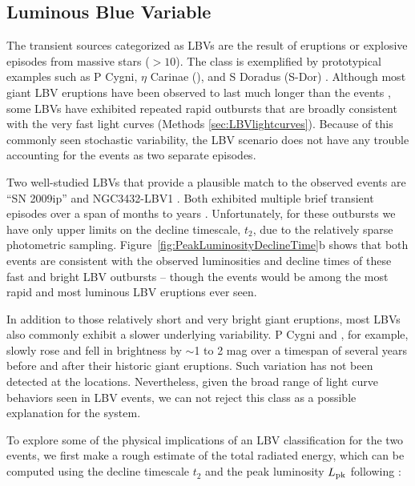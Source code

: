 \subsection{Luminous Blue Variable}

The transient sources categorized as LBVs are the result of eruptions
or explosive episodes from massive stars ($>10$\Msun).  The class is
exemplified by prototypical examples such as P Cygni, $\eta$ Carinae
(\etacar), and S Doradus (S-Dor) \citep[for recent overviews of the
  LBV class, see][]{Smith:2011b, Kochanek:2012}.  Although most giant
LBV eruptions have been observed to last much longer than the \spock
events \citep{Smith:2011b}, some LBVs have exhibited repeated rapid
outbursts that are broadly consistent with the very fast \spock light
curves (Methods \ref{sec:LBVlightcurves}). Because of this commonly
seen stochastic variability, the LBV scenario does not have any
trouble accounting for the \spock events as two separate episodes.

Two well-studied LBVs that provide a plausible match to the observed
\spock events are ``SN 2009ip'' \citep{Maza:2009} and NGC3432-LBV1
\citep{Pastorello:2010}.  Both exhibited multiple brief transient
episodes over a span of months to years \citep[e.g.,][]{Miller:2009,
  Li:2009, Berger:2009, Drake:2010, Pastorello:2010}.  Unfortunately,
for these outbursts we have only upper limits on the decline
timescale, $t_2$, due to the relatively sparse photometric sampling.
Figure~\ref{fig:PeakLuminosityDeclineTime}b shows that both \spock
events are consistent with the observed luminosities and decline times
of these fast and bright LBV outbursts -- though the \spock events
would be among the most rapid and most luminous LBV eruptions ever
seen.

In addition to those relatively short and very bright giant eruptions,
most LBVs also commonly exhibit a slower underlying variability. P
Cygni and \etaCar, for example, slowly rose and fell in brightness by
$\sim$1 to 2 mag over a timespan of several years before and after
their historic giant eruptions.  Such variation has not been detected
at the \spock locations. Nevertheless, given the broad
range of light curve behaviors seen in LBV events, we can not reject
this class as a possible explanation for the \spock system.

To explore some of the physical implications of an LBV
classification for the two \spock events, we first make a rough
estimate of the total radiated energy, which can be computed using the
decline timescale $t_2$ and the peak luminosity $L_{\rm pk}$ following
\citet{Smith:2011b}:

